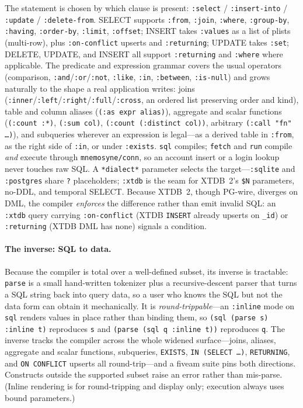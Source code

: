 \documentclass[11pt,a4paper]{article}
\begin{document}
The statement is chosen by which clause is present: \texttt{:select} /
\texttt{:insert-into} / \texttt{:update} / \texttt{:delete-from}. SELECT supports
\texttt{:from}, \texttt{:join}, \texttt{:where}, \texttt{:group-by}, \texttt{:having},
\texttt{:order-by}, \texttt{:limit}, \texttt{:offset}; INSERT takes \texttt{:values} as a
list of plists (multi-row), plus \texttt{:on-conflict} upserts and \texttt{:returning};
UPDATE takes \texttt{:set}; DELETE, UPDATE, and INSERT all support \texttt{:returning} and
\texttt{:where} where applicable. The predicate and expression grammar covers the usual
operators (comparison, \texttt{:and}/\texttt{:or}/\texttt{:not}, \texttt{:like}, \texttt{:in},
\texttt{:between}, \texttt{:is-null}) and grows naturally to the shape a real application
writes: joins (\texttt{:inner}/\texttt{:left}/\texttt{:right}/\texttt{:full}/\texttt{:cross},
an ordered list preserving order and kind), table and column aliases (\texttt{(:as expr
alias)}), aggregate and scalar functions (\texttt{(:count :*)}, \texttt{(:sum col)},
\texttt{(:count (:distinct col))}, arbitrary \texttt{(:call "fn" \ldots)}), and subqueries
wherever an expression is legal---as a derived table in \texttt{:from}, as the right side of
\texttt{:in}, or under \texttt{:exists}. \texttt{sql} compiles; \texttt{fetch} and
\texttt{run} compile \emph{and} execute through \texttt{mnemosyne/conn}, so an account insert
or a login lookup never touches raw SQL. A \texttt{*dialect*} parameter selects the
target---\texttt{:sqlite} and \texttt{:postgres} share \texttt{?} placeholders; \texttt{:xtdb}
is the seam for XTDB~2's \texttt{\$N} parameters, no-DDL, and temporal SELECT. Because XTDB~2,
though PG-wire, diverges on DML, the compiler \emph{enforces} the difference rather than emit
invalid SQL: an \texttt{:xtdb} query carrying \texttt{:on-conflict} (XTDB \texttt{INSERT}
already upserts on \texttt{\_id}) or \texttt{:returning} (XTDB DML has none) signals a
condition.

\paragraph{The inverse: SQL to data.} Because the compiler is total over a well-defined
subset, its inverse is tractable: \texttt{parse} is a small hand-written tokenizer plus a
recursive-descent parser that turns a SQL string back into query data, so a user who knows
the SQL but not the data form can obtain it mechanically. It is \emph{round-trippable}---an
\texttt{:inline} mode on \texttt{sql} renders values in place rather than binding them, so
\texttt{(sql (parse s) :inline t)} reproduces \texttt{s} and \texttt{(parse (sql q :inline
t))} reproduces \texttt{q}. The inverse tracks the compiler across the whole widened
surface---joins, aliases, aggregate and scalar functions, subqueries, \texttt{EXISTS},
\texttt{IN (SELECT \ldots)}, \texttt{RETURNING}, and \texttt{ON CONFLICT} upserts all
round-trip---and a fiveam suite pins both directions. Constructs outside the supported subset
raise an error rather than mis-parse. (Inline rendering is for round-tripping and display
only; execution always uses bound parameters.)
\end{document}
